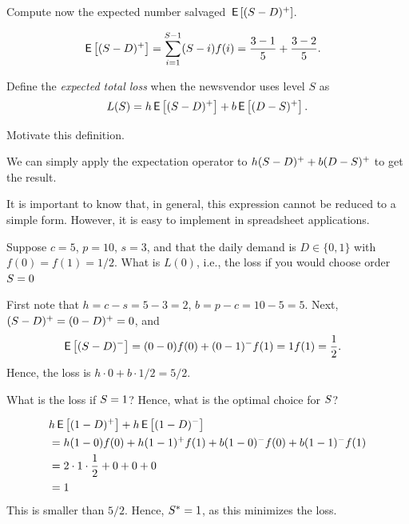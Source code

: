 \begin{exercise}[continuation]
 Compute now the expected number salvaged $\,\mathsf{E}\left[(S-D)^+\right]$.
  \begin{solution}
    \begin{align*}
      \,\mathsf{E}\left[(S-D)^+\right] &= \sum_{i=1}^{S-1} (S-i) f(i) = \frac{3-1}5 + \frac{3-2}5.
    \end{align*}
  \end{solution}
\end{exercise}

Define the \emph{expected total loss} when the newsvendor uses level $S$ as
\begin{align}\label{eq:59}
L(S) = h\,\mathsf{E}\left[(S-D)^+\right] + b\,\mathsf{E}\left[(D-S)^+\right].
\end{align}

\begin{exercise}
Motivate this definition.
\begin{solution}
We can  simply apply the expectation operator to $h(S-D)^+ + b(D-S)^+$ to get the result.

It is important to know that, in general, this expression cannot be reduced to a simple form. However, it is easy to implement in spreadsheet applications.
\end{solution}
\end{exercise}

\begin{exercise}
Suppose $c = 5$, $p=10$, $s=3$,  and that the daily demand is $D\in \{0,1\}$ with $f(0) = f(1) =1/2$. What is $L(0)$, i.e., the loss if you would choose order $S=0$ 
\begin{solution}
First note that $h=c-s=5-3=2$, $b=p-c=10-5=5$. Next, $(S-D)^+=(0-D)^+=0$, and
\begin{align*}
  \,\mathsf{E}\left[(S-D)^-\right]
&= (0-0)f(0) + (0-1)^-f(1) = 1f(1) = \frac 1 2.
\end{align*}
Hence, the loss is $h\cdot 0 + b \cdot 1/2 = 5/2$.
\end{solution}
\end{exercise}

\begin{exercise}[Continuation]  What is the loss if $S=1$?  Hence, what is the optimal choice for $S$?
\begin{solution}
\begin{align*}
&h\,\mathsf{E}\left[(1-D)^+\right] + h\,\mathsf{E}\left[(1-D)^-\right] \\
&= h (1-0)f(0) + h(1-1)^+f(1) + b (1-0)^-f(0) + b(1-1)^-f(1) \\
&= 2\cdot1\cdot\frac 1 2 + 0 + 0 + 0 \\
&=1
\end{align*}
This is smaller than $5/2$. Hence, $S^*=1$, as this minimizes the loss.
\end{solution}
\end{exercise}

